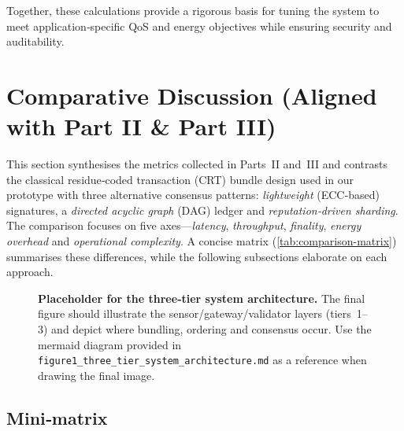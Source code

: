 Together, these calculations provide a rigorous basis for tuning the system to meet
application‑specific QoS and energy objectives while ensuring security and auditability.
\section{Comparative Discussion (Aligned with Part II \& Part III)}
\label{sec:comparative-discussion}

This section synthesises the metrics collected in Parts~II and~III and contrasts the classical residue‑coded transaction (CRT) bundle design used in our prototype with three alternative consensus patterns: \emph{lightweight} (ECC‑based) signatures, a \emph{directed acyclic graph} (DAG) ledger and \emph{reputation‑driven sharding}.  The comparison focuses on five axes—\emph{latency}, \emph{throughput}, \emph{finality}, \emph{energy overhead} and \emph{operational complexity}.  A concise matrix (\autoref{tab:comparison-matrix}) summarises these differences, while the following subsections elaborate on each approach.

\begin{figure}[h]
  \centering
  \caption{\textbf{Placeholder for the three‑tier system architecture.}  The final figure should illustrate the sensor/gateway/validator layers (tiers~1–3) and depict where bundling, ordering and consensus occur.  Use the mermaid diagram provided in \texttt{figure1\_three\_tier\_system\_architecture.md} as a reference when drawing the final image.}
  \label{fig:three-tier-architecture}
\end{figure}

\subsection{Mini‑matrix}
\label{subsec:comparison-matrix}

